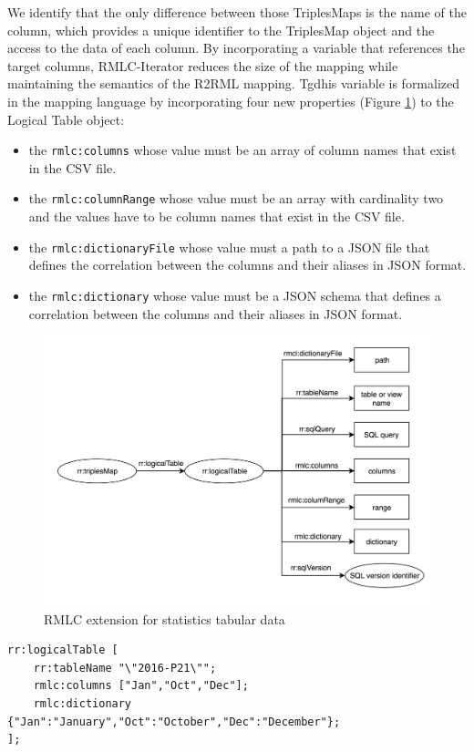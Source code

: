 We identify that the only difference between those TriplesMaps is the name of the column, which provides a unique identifier to the TriplesMap object and the access to the data of each column. By incorporating a variable that references the target columns, RMLC-Iterator reduces the size of the mapping while maintaining the semantics of the R2RML mapping. Tgdhis variable is formalized in the mapping language by incorporating four new properties (Figure \ref{fig:rmlc}) to the Logical Table object:
\begin{itemize}
\item the \texttt{rmlc:columns} whose value must be an array of column names that exist in the CSV file.
\item the \texttt{rmlc:columnRange} whose value must be an array with cardinality two and the values have to be column names that exist in the CSV file.
\item the \texttt{rmlc:dictionaryFile} whose value must a path to a JSON file that defines the correlation between the columns and their aliases in JSON format.
\item the \texttt{rmlc:dictionary} whose value must be a JSON schema that defines a correlation between the columns and their aliases in JSON format.
\end{itemize}

\begin{figure}[h]
  \centering
  \includegraphics[width=1.0\linewidth]{figures/rmlc-iterator.png}
  \caption{RMLC extension for statistics tabular data}
  \label{fig:rmlc}
\end{figure}

\begin{lstlisting}[float,caption=Columns and dictionary properties in RMLC,frame=tlrb,label={list:columns}, columns=fullflexible]
rr:logicalTable [
    rr:tableName "\"2016-P21\"";
    rmlc:columns ["Jan","Oct","Dec"];
    rmlc:dictionary {"Jan":"January","Oct":"October","Dec":"December"};
];
\end{lstlisting}

